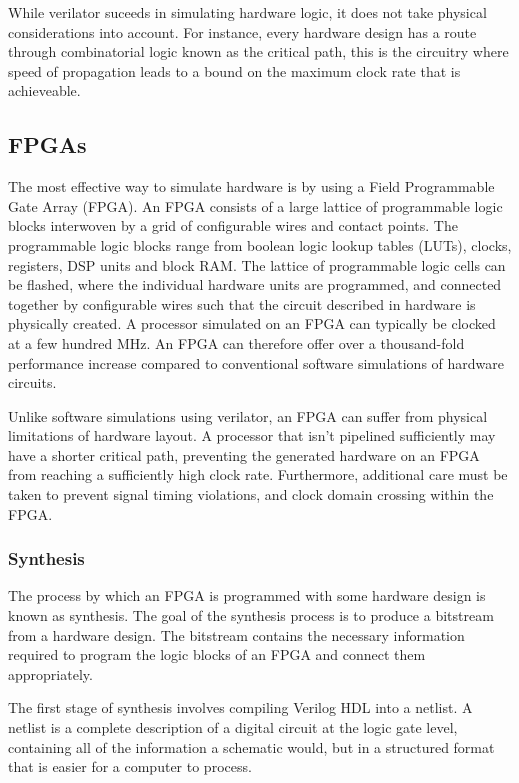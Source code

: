 \documentclass[a4paper,8pt]{report}
\begin{document}
While verilator suceeds in simulating hardware logic, it does not take physical
considerations into account. For instance, every hardware design has a route through
combinatorial logic known as the critical path, this is the circuitry where
speed of propagation leads to a bound on the maximum clock rate that is
achieveable.


\subsection{FPGAs}
The most effective way to simulate hardware is by using a Field Programmable
Gate Array (FPGA). An FPGA consists of a large lattice of programmable logic
blocks interwoven by a grid of configurable wires and contact points. The
programmable logic blocks range from boolean logic lookup tables (LUTs), clocks,
registers, DSP units and block RAM. The lattice of programmable logic cells can
be flashed, where the individual hardware units are programmed, and connected
together by configurable wires such that the circuit described in hardware is
physically created. A processor simulated on an FPGA can typically be clocked at
a few hundred MHz. An FPGA can therefore offer over a thousand-fold performance
increase compared to conventional software simulations of hardware circuits.

Unlike software simulations using verilator, an FPGA can suffer from physical
limitations of hardware layout. A processor that isn't pipelined sufficiently
may have a shorter critical path, preventing the generated hardware on an FPGA
from reaching a sufficiently high clock rate. Furthermore, additional care must
be taken to prevent signal timing violations, and clock domain crossing within
the FPGA.


\subsubsection{Synthesis}
The process by which an FPGA is programmed with some hardware design is known
as synthesis. The goal of the synthesis process is to produce a bitstream from a
hardware design. The bitstream contains the necessary information required to
program the logic blocks of an FPGA and connect them appropriately.

The first stage of synthesis involves compiling Verilog HDL into a netlist.
A netlist is a complete description of a digital circuit at the logic gate
level, containing all of the information a schematic would, but in a structured
format that is easier for a computer to process.
\end{document}

